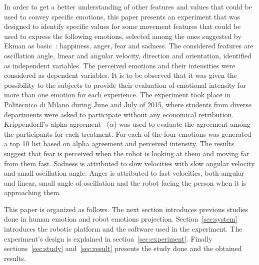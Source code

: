 In order to get a better understanding of other features and values that could be used to convey specific emotions, this paper presents an experiment that was designed to identify specific values for some movement features that could be used to express the following emotions, selected among the ones suggested by Ekman as basic~\cite{Ekman2004}: happiness, anger, fear and sadness. The considered features are oscillation angle, linear and angular velocity, direction and orientation, identified as independent variables. The perceived emotions and their intensities were considered as dependent variables. It is to be observed that it was given the possibility to the subjects to provide their evaluation of emotional intensity for more than one emotion for each experience. The experiment took place in Politecnico di Milano during June and July of 2015, where students from diverse departments were asked to participate without any economical retribution. Krippendorff's alpha agreement~\cite{Krippendorff2007} ($\alpha$) was used to evaluate the agreement among the participants for each treatment. For each of the four emotions was generated a top 10 list based on alpha agreement and perceived intensity. The results suggest that fear is perceived when the robot is looking at them and moving far from them fast. Sadness is attributed to slow velocities with slow angular velocity and small oscillation angle. Anger is attributed to fast velocities, both angular and linear, small angle of oscillation and the robot facing the person when it is approaching them.

This paper is organized as follows. The next section introduces previous studies done in human emotion and robot emotions projection. Section~\ref{sec:system} introduces the robotic platform and the software used in the experiment. The experiment's design is explained in section~\ref{sec:experiment}. Finally sections~\ref{sec:study} and~\ref{sec:result} presents the study done and the obtained results.